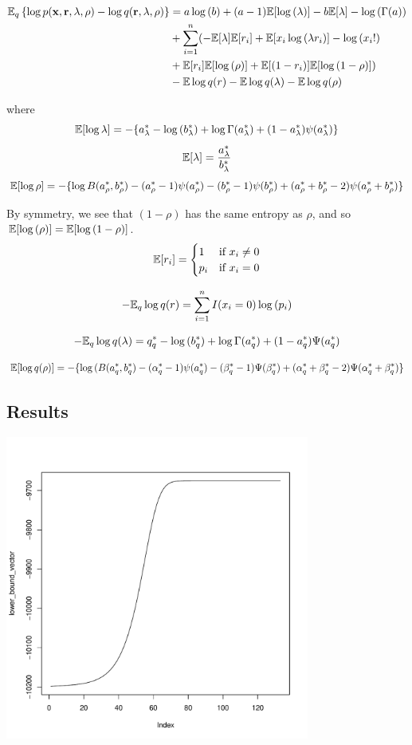 \documentclass{amsart}
\begin{document}
\begin{align*}
\mathbb{E}_q \left\{ \log{p(\bf x, \bf r, \lambda, \rho)} - \log{q(\bf r, \lambda, \rho)} \right\} &= 
a \log{(b)} + (a - 1) \mathbb{E}[\log{(\lambda)}] - b \mathbb{E} [\lambda] - \log{(\Gamma(a))} \\
&+ \sum_{i=1}^n  ( -\mathbb{E} [\lambda] \mathbb{E} [r_i] + \mathbb{E}[x_i \log{(\lambda r_i)}] - \log{(x_i!)} \\
&+ \mathbb{E}[r_i] \mathbb{E}[\log{(\rho)}] + \mathbb{E}[(1 - r_i)] \mathbb{E}[\log{(1 - \rho)}] ) \\
& - \mathbb{E} \log{q(r)} - \mathbb{E} \log{q(\lambda)} - \mathbb{E} \log{q(\rho)}
\end{align*}

where
$$
\mathbb{E} [\log{\lambda}] = -\{ a_\lambda^* - \log{(b_\lambda^*)} + \log{\Gamma(a_\lambda^*)} + (1 - a_\lambda^*) \psi{(a_\lambda^*)} \} \\
$$
$$
\mathbb{E} [\lambda] = \frac{a_\lambda^*}{b_\lambda^*} \\
$$
$$
\mathbb{E}[\log{\rho}] = - \{ \log{B(a_\rho^*, b_\rho^*)} - (a_\rho^* - 1) \psi{(a_\rho^*)} - (b_\rho^* - 1)\psi{(b_\rho^*)} + (a_\rho^* + b_\rho^* - 2)\psi{(a_\rho^* + b_\rho^*)} \} \\
$$

By symmetry, we see that $(1 - \rho)$ has the same entropy as $\rho$,
and so $\mathbb{E} [\log{(\rho)}] = \mathbb{E} [\log{(1 - \rho)}]$.
$$
\mathbb{E}[r_i] = 
	\begin{cases}
	1 & \text{if } x_i \ne 0 \\
	p_i & \text{if } x_i = 0 \\
	\end{cases}
$$

$$
-\mathbb{E}_q \log{q(r)} = \sum_{i=1}^n I(x_i = 0) \log{(p_i)}
$$

$$
-\mathbb{E}_q \log{q(\lambda)} = q_q^* - \log{(b_q^*)} + \log{\Gamma{(a_q^*)}} + (1 - a_q^*) \Psi{(a_q^*)}
$$

$$
\mathbb{E}[\log{q(\rho)}] = - \{ \log{(B(a_q^*, b_q^*)} - (\alpha_q^* - 1) \psi{(a_q^*)} - (\beta_q^* - 1)\Psi{(\beta_q^*)} + (\alpha_q^* + \beta_q^* - 2)\Psi{(\alpha_q^* + \beta_q^*)} \}
$$

\subsection{Results}
\includegraphics[width=100mm,height=100mm]{code/lower_bound_convergence.pdf}
\end{document}
